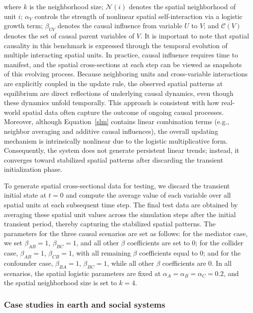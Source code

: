 \documentclass[authoryear,preprint,review,12pt]{elsarticle}
\begin{document}
\noindent where \(k\) is the neighborhood size; \(\mathcal{N}(i)\) denotes the spatial neighborhood of unit \(i\); \(\alpha_V\) controls the strength of nonlinear spatial self-interaction via a logistic growth term; \(\beta_{UV}\) denotes the causal influence from variable \(U\) to \(V\); and \(\mathcal{C}(V)\) denotes the set of causal parent variables of \(V\). It is important to note that spatial causality in this benchmark is expressed through the temporal evolution of multiple interacting spatial units. In practice, causal influence requires time to manifest, and the spatial cross-sections at each step can be viewed as snapshots of this evolving process. Because neighboring units and cross-variable interactions are explicitly coupled in the update rule, the observed spatial patterns at equilibrium are direct reflections of underlying causal dynamics, even though these dynamics unfold temporally. This approach is consistent with how real-world spatial data often capture the outcome of ongoing causal processes. Moreover, although Equation~\ref{slm} contains linear combination terms (e.g., neighbor averaging and additive causal influences), the overall updating mechanism is intrinsically nonlinear due to the logistic multiplicative form. Consequently, the system does not generate persistent linear trends; instead, it converges toward stabilized spatial patterns after discarding the transient initialization phase.

To generate spatial cross-sectional data for testing, we discard the transient initial state at \(t=0\) and compute the average value of each variable over all spatial units at each subsequent time step. The final test data are obtained by averaging these spatial unit values across the simulation steps after the initial transient period, thereby capturing the stabilized spatial patterns. The parameters for the three causal scenarios are set as follows: for the mediator case, we set \(\beta_{AB}=1\), \(\beta_{BC}=1\), and all other \(\beta\) coefficients are set to $0$; for the collider case, \(\beta_{AB}=1\), \(\beta_{CB}=1\), with all remaining \(\beta\) coefficients equal to $0$; and for the confounder case, \(\beta_{BA}=1\), \(\beta_{BC}=1\), while all other \(\beta\) coefficients are $0$. In all scenarios, the spatial logistic parameters are fixed at \(\alpha_A = \alpha_B = \alpha_C = 0.2\), and the spatial neighborhood size is set to \(k=4\).

\subsubsection{Case studies in earth and social systems}
\end{document}
